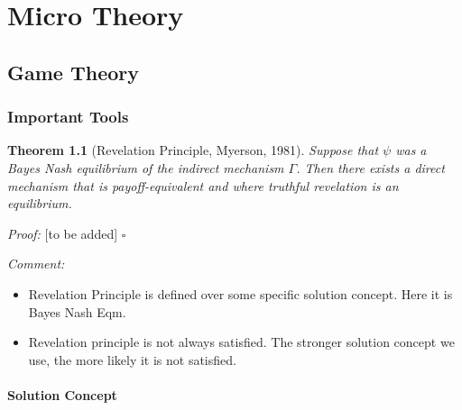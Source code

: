 \documentclass{book}
\theoremstyle{plain}
\newtheorem{thm}{Theorem}[section] %
\theoremstyle{definition}
\newenvironment{myproof}
{\noindent\textit{Proof:}}{\hfill$\square$}
\begin{document}





\part{Micro Theory} %
\label{prt:micro_ _theory_}


\chapter{Game Theory} %
\label{cha:game_theory}

\section{Important Tools} %
\label{sec:important_tools}

\begin{thm}[Revelation Principle, Myerson, 1981]
Suppose that $\psi$ was a Bayes Nash equilibrium of the indirect mechanism $\Gamma$. 
Then there exists a direct mechanism that is payoff-equivalent and where truthful revelation is an equilibrium.
\end{thm}

\begin{myproof}
[to be added]
\end{myproof}

\begin{singlespacing}
\noindent
\textit{Comment:}
\end{singlespacing}
\begin{itemize}
	\setlength{\itemsep}{0pt}
	\item Revelation Principle is defined over some specific solution concept. Here it is Bayes Nash Eqm.
	\item Revelation principle is not always satisfied. The stronger solution concept we use, the more likely it is not satisfied.
\end{itemize}


\subsection{Solution Concept} %
\label{sec:solution_concept}
\end{document}
